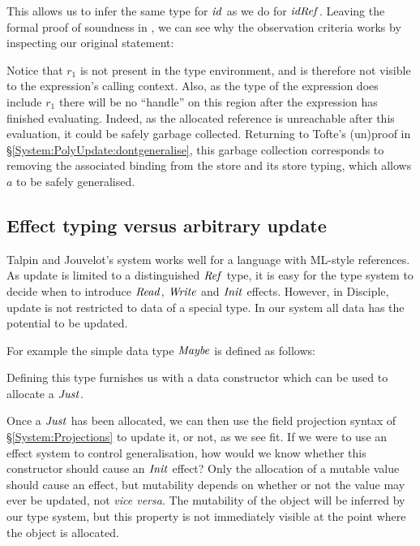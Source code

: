 
This allows us to infer the same type for $\operatorname{\mathit{id}}$ as we do for $\operatorname{\mathit{idRef}}$. Leaving the formal proof of soundness in \cite{talpin:discipline}, we can see why the observation criteria works by inspecting our original statement:


Notice that $r_1$ is not present in the type environment, and is therefore not visible to the expression's calling context. Also, as the type of the expression does include $r_1$ there will be no ``handle'' on this region after the expression has finished evaluating. Indeed, as the allocated reference is unreachable after this evaluation, it could be safely garbage collected. Returning to Tofte's (un)proof in \S\ref{System:PolyUpdate:dontgeneralise}, this garbage collection corresponds to removing the associated binding from the store and its store typing, which allows $a$ to be safely generalised.


\subsection{Effect typing versus arbitrary update}
Talpin and Jouvelot's system works well for a language with ML-style references. As update is limited to a distinguished $\operatorname{\mathit{Ref}}$ type, it is easy for the type system to decide when to introduce $\operatorname{\mathit{Read}}$, $\operatorname{\mathit{Write}}$ and $\operatorname{\mathit{Init}}$ effects. However, in Disciple, update is not restricted to data of a special type. In our system all data has the potential to be updated. 

\clearpage{}
For example the simple data type $\operatorname{\mathit{Maybe}}$ is defined as follows:


Defining this type furnishes us with a data constructor which can be used to allocate a $\operatorname{\mathit{Just}}$.


Once a $\operatorname{\mathit{Just}}$ has been allocated, we can then use the field projection syntax of \S\ref{System:Projections} to update it, or not, as we see fit. If we were to use an effect system to control generalisation, how would we know whether this constructor should cause an $\operatorname{\mathit{Init}}$ effect? Only the allocation of a mutable value should cause an effect, but mutability depends on whether or not the value may ever be updated, not \emph{vice versa}. The mutability of the object will be inferred by our type system, but this property is not immediately visible at the point where the object is allocated.


